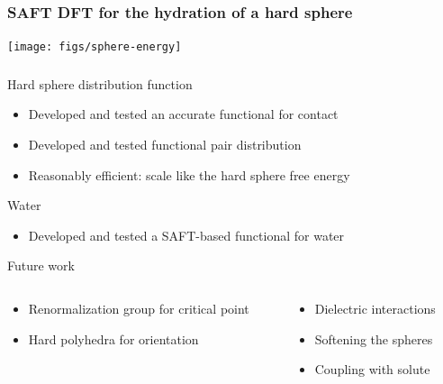
\begin{frame}
  \frametitle{SAFT DFT for the hydration of a hard sphere}
  \begin{center}
    \vspace{-1em}
    \texttt{[image: figs/sphere-energy]}
  \end{center}
  \vspace{-1.5em}
\end{frame}

\begin{frame}
  \frametitle{\conclude}
  \vspace{2em}
  \begin{block}{Hard sphere distribution function}
    \begin{itemize}
    \item Developed and tested an accurate functional for contact
    \item Developed and tested functional pair distribution
    \item Reasonably efficient: scale like the hard sphere free
      energy
    \end{itemize}
  \end{block}
  \begin{block}{Water}
    \begin{itemize}
    \item Developed and tested a SAFT-based functional for water
    \end{itemize}
  \end{block}
  \begin{block}{Future work}
    \begin{columns}
      \begin{column}{0.6\columnwidth}
        \begin{itemize}
        \item Renormalization group for critical point
        \item Hard polyhedra for orientation
        \end{itemize}
      \end{column}
      \begin{column}{0.5\columnwidth}
        \begin{itemize}
        \item Dielectric interactions
        \item Softening the spheres
        \item Coupling with solute
        \end{itemize}
      \end{column}
    \end{columns}
  \end{block}
\end{frame}
